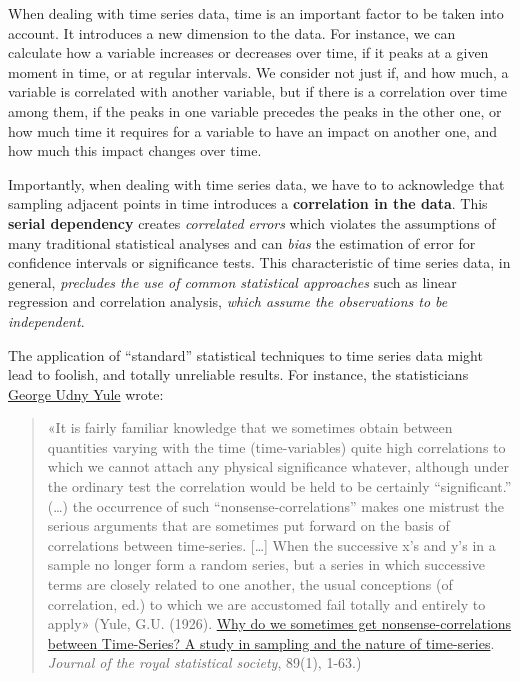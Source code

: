 \documentclass[
]{article}
\begin{document}
When dealing with time series data, time is an important factor to be taken into account. It introduces a new dimension to the data. For instance, we can calculate how a variable increases or decreases over time, if it peaks at a given moment in time, or at regular intervals. We consider not just if, and how much, a variable is correlated with another variable, but if there is a correlation over time among them, if the peaks in one variable precedes the peaks in the other one, or how much time it requires for a variable to have an impact on another one, and how much this impact changes over time.

Importantly, when dealing with time series data, we have to to acknowledge that sampling adjacent points in time introduces a \textbf{correlation in the data}. This \textbf{serial dependency} creates \emph{correlated errors} which violates the assumptions of many traditional statistical analyses and can \emph{bias} the estimation of error for confidence intervals or significance tests. This characteristic of time series data, in general, \emph{precludes the use of common statistical approaches} such as linear regression and correlation analysis, \emph{which assume the observations to be independent}.

The application of ``standard'' statistical techniques to time series data might lead to foolish, and totally unreliable results. For instance, the statisticians \href{https://en.wikipedia.org/wiki/Udny_Yule}{George Udny Yule} wrote:

\begin{quote}
«It is fairly familiar knowledge that we sometimes obtain between quantities varying with the time (time-variables) quite high correlations to which we cannot attach any physical significance whatever, although under the ordinary test the correlation would be held to be certainly ``significant.'' (\ldots) the occurrence of such ``nonsense-correlations'' makes one mistrust the serious arguments that are sometimes put forward on the basis of correlations between time-series. {[}\ldots{]} When the successive x's and y's in a sample no longer form a random series, but a series in which successive terms are closely related to one another, the usual conceptions (of correlation, ed.) to which we are accustomed fail totally and entirely to apply» (Yule, G.U. (1926). \href{https://www.jstor.org/stable/pdf/2341482.pdf}{Why do we sometimes get nonsense-correlations between Time-Series? A study in sampling and the nature of time-series}. \emph{Journal of the royal statistical society}, 89(1), 1-63.)
\end{quote}
\end{document}
